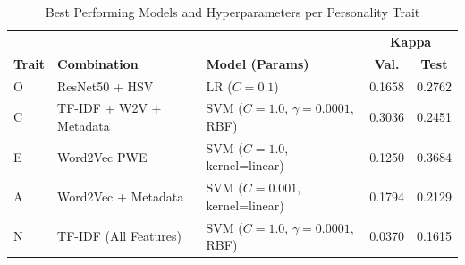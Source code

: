 \begin{table}[H]
	\centering
	\caption{Best Performing Models and Hyperparameters per Personality Trait}
	\label{tab:best_overall}
	\begin{tabularx}{\textwidth}{@{} l X X c c @{}}
		\toprule
        \multicolumn{3}{l}{}      & \multicolumn{2}{c}{\textbf{Kappa}} \\
		\textbf{Trait} & \textbf{Combination} & \textbf{Model (Params)} & \textbf{Val.} & \textbf{Test} \\
		\midrule
        O & ResNet50 + HSV  & LR ($C=0.1$) & 0.1658 & 0.2762 \\
        C & TF-IDF + W2V + Metadata & SVM ($C=1.0$, $\gamma=0.0001$, RBF) & 0.3036 & 0.2451 \\
        E & Word2Vec PWE & SVM ($C=1.0$, kernel=linear) & 0.1250 & 0.3684 \\
        A & Word2Vec + Metadata & SVM ($C=0.001$, kernel=linear) & 0.1794 & 0.2129 \\
        N & TF-IDF (All Features) & SVM ($C=1.0$, $\gamma=0.0001$, RBF) & 0.0370 & 0.1615 \\
		\bottomrule
	\end{tabularx}
\end{table}

